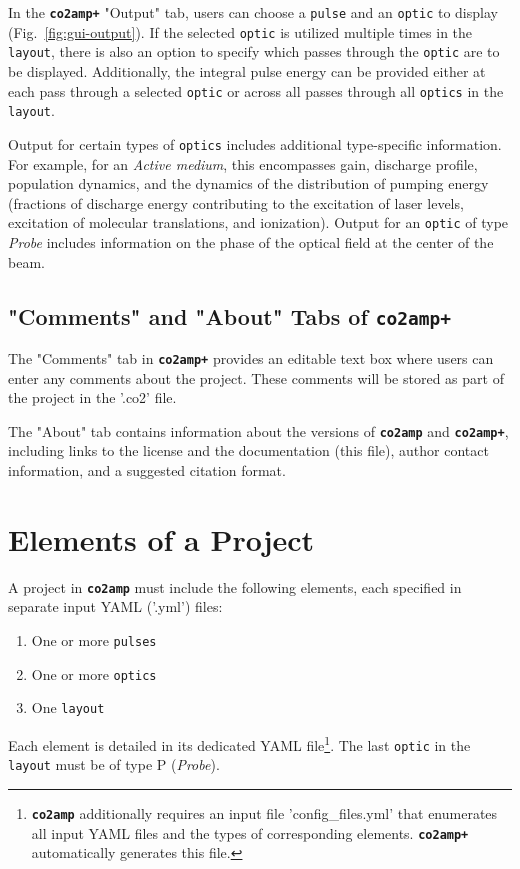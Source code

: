 \documentclass{report}
\begin{document}
In the \textbf{\texttt{co2amp+}} "Output" tab, users can choose a \texttt{pulse} and an \texttt{optic} to display (Fig.~\ref{fig:gui-output}). If the selected \texttt{optic} is utilized multiple times in the \texttt{layout}, there is also an option to specify which passes through the \texttt{optic} are to be displayed. Additionally, the integral pulse energy can be provided either at each pass through a selected \texttt{optic} or across all passes through all \texttt{optics} in the \texttt{layout}.

Output for certain types of \texttt{optics} includes additional type-specific information. For example, for an \textit{Active medium}, this encompasses gain, discharge profile, population dynamics, and the dynamics of the distribution of pumping energy (fractions of discharge energy contributing to the excitation of laser levels, excitation of molecular translations, and ionization). Output for an \texttt{optic} of type \textit{Probe} includes information on the phase of the optical field at the center of the beam.


\section{"Comments" and "About" Tabs of \textbf{\texttt{co2amp+}}}
The "Comments" tab in \textbf{\texttt{co2amp+}} provides an editable text box where users can enter any comments about the project. These comments will be stored as part of the project in the '.co2' file.

The "About" tab contains information about the versions of \textbf{\texttt{co2amp}} and \textbf{\texttt{co2amp+}}, including links to the license and the documentation (this file), author contact information, and a suggested citation format.


\chapter{Elements of a Project}

A project in \textbf{\texttt{co2amp}} must include the following elements, each specified in separate input YAML ('.yml') files:
\begin{enumerate}
    \item One or more \texttt{pulses}
    \item One or more \texttt{optics}
    \item One \texttt{layout}
\end{enumerate}
Each element is detailed in its dedicated YAML file\footnote{\textbf{\texttt{co2amp}} additionally requires an input file 'config\_files.yml' that enumerates all input YAML files and the types of corresponding elements. \textbf{\texttt{co2amp+}} automatically generates this file.}. The last \texttt{optic} in the \texttt{layout} must be of type P (\textit{Probe}).
\end{document}
